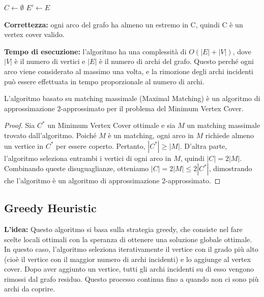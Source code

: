 \begin{algorithm}[H]
\DontPrintSemicolon
\caption{Algoritmo di Approssimazione per Vertex Cover}
\label{alg:vertex_cover}

$C \gets \emptyset$\;
$E' \gets E$\;

\;
\end{algorithm}

\textbf{Correttezza:} ogni arco del grafo ha almeno un estremo in C, quindi C è un vertex cover valido.

\textbf{Tempo di esecuzione: }l'algoritmo ha una complessità di $O(|E|+|V|)$, dove $|V|$ è il numero di vertici e $|E|$ è il numero di archi del grafo. Questo perché ogni arco viene considerato al massimo una volta, e la rimozione degli archi incidenti può essere effettuata in tempo proporzionale al numero di archi.

\begin{teorema} \label{aprxteorem}
  \leavevmode 
L'algoritmo basato su matching massimale (Maximal Matching) è un algoritmo di approssimazione $2$-approssimato per il problema del Minimum Vertex Cover.
\end{teorema}

\begin{proof}
Sia $C^*$ un Minimum Vertex Cover ottimale e sia $M$ un matching massimale trovato dall'algoritmo. Poiché $M$ è un matching, ogni arco in $M$ richiede almeno un vertice in $C^*$ per essere coperto. Pertanto, $|C^*| \geq |M|$. D'altra parte, l'algoritmo seleziona entrambi i vertici di ogni arco in $M$, quindi $|C| = 2|M|$. Combinando queste disuguaglianze, otteniamo $|C| = 2|M| \leq 2|C^*|$, dimostrando che l'algoritmo è un algoritmo di approssimazione $2$-approssimato.
\end{proof}

\subsection{Greedy Heuristic}

\textbf{L'idea:} Questo algoritmo si basa sulla strategia greedy, che consiste nel fare scelte locali ottimali con la speranza di ottenere una soluzione globale ottimale. In questo caso, l'algoritmo seleziona iterativamente il vertice con il grado più alto (cioè il vertice con il maggior numero di archi incidenti) e lo aggiunge al vertex cover. Dopo aver aggiunto un vertice, tutti gli archi incidenti su di esso vengono rimossi dal grafo residuo. Questo processo continua fino a quando non ci sono più archi da coprire.

